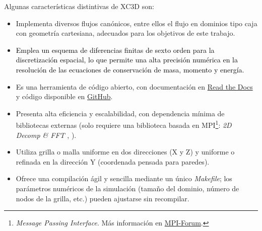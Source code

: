 Algunas características distintivas de XC3D son:
\begin{itemize}
\item Implementa diversos flujos canónicos, entre ellos el flujo en dominios tipo caja con geometría cartesiana, adecuados para los objetivos de este trabajo.
\item \textcolor{black}{Emplea un esquema de diferencias finitas de sexto orden para la discretización espacial, lo que permite una alta precisión numérica en la resolución de las ecuaciones de conservación de masa, momento y energía.}
\item Es una herramienta de código abierto, con documentación en \href{https://xcompact3d.readthedocs.io/en/latest/}{Read the Docs} y código disponible en \href{https://github.com/xcompact3d}{GitHub}.
\item Presenta alta eficiencia y escalabilidad, con dependencia mínima de bibliotecas externas (solo requiere una biblioteca basada en MPI\footnote{\textit{Message Passing Interface}. Más información en \href{https://www.mpi-forum.org/}{MPI-Forum}.}: \textit{2D Decomp \& FFT} \cite{li20102decomp}, \cite{laizet2011incompact3d}).
\item Utiliza grilla o malla uniforme en dos direcciones (X y Z) y uniforme o refinada en la dirección Y (coordenada
pensada para paredes).
\item Ofrece una compilación ágil y sencilla mediante un único \textit{Makefile}; los parámetros numéricos de la simulación (tamaño del dominio, número de nodos de la grilla, etc.) pueden ajustarse sin recompilar.
\end{itemize}

\newpage

